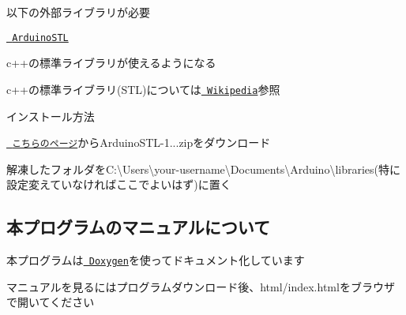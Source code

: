 \begin{DoxyItemize}
\item 以下の外部ライブラリが必要
\begin{DoxyItemize}
\item \href{https://www.arduinolibraries.info/libraries/arduino-stl}{\texttt{ Arduino\+S\+TL}}
\begin{DoxyItemize}
\item c++の標準ライブラリが使えるようになる
\begin{DoxyItemize}
\item c++の標準ライブラリ(S\+TL)については\href{https://ja.wikipedia.org/wiki/Standard_Template_Library}{\texttt{ Wikipedia}}参照
\end{DoxyItemize}
\item インストール方法
\begin{DoxyItemize}
\item \href{https://www.arduinolibraries.info/libraries/arduino-stl}{\texttt{ こちらのページ}}から{\ttfamily Arduino\+S\+T\+L-\/1...\+zip}をダウンロード
\item 解凍したフォルダを{\ttfamily C\+:\textbackslash{}Users\textbackslash{}your-\/username\textbackslash{}Documents\textbackslash{}Arduino\textbackslash{}libraries}(特に設定変えていなければここでよいはず)に置く
\end{DoxyItemize}
\end{DoxyItemize}
\end{DoxyItemize}
\end{DoxyItemize}

\subsection*{本プログラムのマニュアルについて}


\begin{DoxyItemize}
\item 本プログラムは\href{http://www.doxygen.nl/index.html}{\texttt{ Doxygen}}を使ってドキュメント化しています
\item マニュアルを見るにはプログラムダウンロード後、html/index.htmlをブラウザで開いてください 
\end{DoxyItemize}